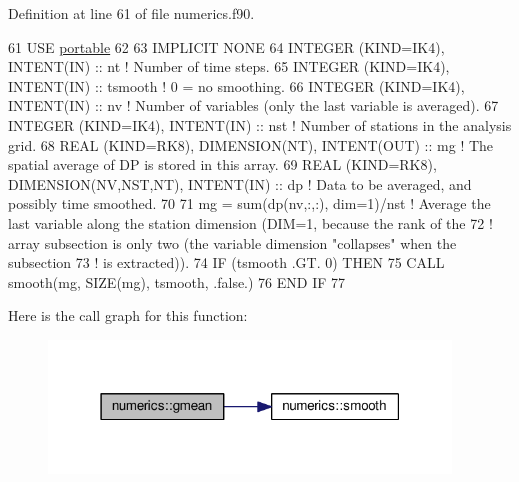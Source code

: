 Definition at line 61 of file numerics.\+f90.


\begin{DoxyCode}
61 \textcolor{keywordtype}{USE }\hyperlink{namespaceportable}{portable}
62 
63 \textcolor{keywordtype}{IMPLICIT NONE}
64 \textcolor{keywordtype}{INTEGER (KIND=IK4)}, \textcolor{keywordtype}{INTENT(IN)}                      :: nt           \textcolor{comment}{! Number of time steps.}
65 \textcolor{keywordtype}{INTEGER (KIND=IK4)}, \textcolor{keywordtype}{INTENT(IN)}                      :: tsmooth      \textcolor{comment}{! 0 = no smoothing.}
66 \textcolor{keywordtype}{INTEGER (KIND=IK4)}, \textcolor{keywordtype}{INTENT(IN)}                      :: nv           \textcolor{comment}{! Number of variables (only the last
       variable is averaged).}
67 \textcolor{keywordtype}{INTEGER (KIND=IK4)}, \textcolor{keywordtype}{INTENT(IN)}                      :: nst          \textcolor{comment}{! Number of stations in the analysis
       grid.}
68 \textcolor{keywordtype}{REAL (KIND=RK8)}, \textcolor{keywordtype}{DIMENSION(NT)}, \textcolor{keywordtype}{INTENT(OUT)}         :: mg           \textcolor{comment}{! The spatial average of DP is stored
       in this array.}
69 \textcolor{keywordtype}{REAL (KIND=RK8)}, \textcolor{keywordtype}{DIMENSION(NV,NST,NT)}, \textcolor{keywordtype}{INTENT(IN)}   :: dp           \textcolor{comment}{! Data to be averaged, and possibly
       time smoothed.}
70 
71 mg  = sum(dp(nv,:,:), dim=1)/nst        \textcolor{comment}{! Average the last variable along the station dimension (DIM=1,
       because the rank of the}
72                                         \textcolor{comment}{! array subsection is only two (the variable dimension "collapses"
       when the subsection}
73                                         \textcolor{comment}{! is extracted)).}
74 \textcolor{keywordflow}{IF} (tsmooth .GT. 0) \textcolor{keywordflow}{THEN}
75     \textcolor{keyword}{CALL }smooth(mg, \textcolor{keyword}{SIZE}(mg), tsmooth, .false.)
76 \textcolor{keywordflow}{END IF}
77 
\end{DoxyCode}


Here is the call graph for this function\+:\nopagebreak
\begin{figure}[H]
\begin{center}
\leavevmode
\includegraphics[width=303pt]{namespacenumerics_afbd04035bb50e63d44980bf39cf84ac3_cgraph}
\end{center}
\end{figure}


